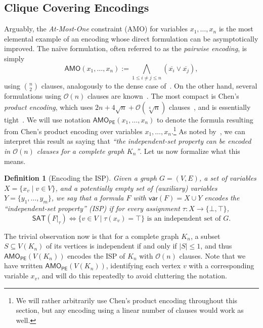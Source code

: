 \documentclass[11pt]{article}
\newtheorem{definition}[theorem]{Definition}
\renewcommand{\O}{\mathcal{O}}
\begin{document}
\subsection{Clique Covering Encodings}
\newcommand{\amope}{\textsf{AMO}_{\textsf{PE}}}
Arguably, the \emph{At-Most-One} constraint (\textsf{AMO}) for variables $x_1, \ldots, x_n$ is the most elemental example of an encoding whose direct formulation can be asymptotically improved. The naïve formulation, often referred to as the \emph{pairwise encoding}, is simply
\[
\textsf{AMO}(x_1, \ldots, x_n) := \bigwedge_{1 \leq i \neq j \leq n} (\overline{x_i} \lor \overline{x_j}),
\]
using $\binom{n}{2}$ clauses, analogously to the dense case of~. On the other hand, several formulations using $\O(n)$ clauses are known~\citep{empirical,zhou2020comparisonsatencodingsatmostk}. The most compact is Chen's \emph{product encoding}, which uses $2n + 4\sqrt{n} + \O(\sqrt[4]{n})$ clauses~\citep{chen2010new}, and is essentially tight~\citep{kuceraLowerBoundCNF2019}. We will use notation $\textsf{AMO}_{\textsf{PE}}(x_1, \ldots, x_n)$ to denote the formula resulting from Chen's product encoding over variables $x_1, \ldots, x_n$.\footnote{We will rather arbitrarily use Chen's product encoding throughout this section, but any encoding using a linear number of clauses would work as well.}
As noted by~\citet{ignatievCardinalityEncodingsGraph2017}, we can interpret this result as saying that \emph{``the independent-set property can be encoded in $\O(n)$ clauses for a complete graph $K_n$''}. Let us now formalize what this means. 

\begin{definition}[Encoding the ISP]
     \label{def:isp_encoding}
    Given a graph $G = (V, E)$,  a set of variables $X = \{ x_v \mid v \in V\}$, and a potentially empty set of (auxiliary) variables $Y = \{y_1, \ldots, y_m\}$, we say that a formula $F$ with $\textsf{var}(F) = X \cup Y$ encodes the ``independent-set property'' (ISP) if for every assignment $\tau : X \to \{\bot, \top\}$,
    \[
        \textsf{SAT}(F |_\tau) \iff \{ v \in V \mid \tau(x_v) = \top \} \text{ is an independent set of } G.
    \]
\end{definition}
The trivial observation now is that for a complete graph $K_n$, a subset $S \subseteq V(K_n)$ of its vertices is independent if and only if $|S| \leq 1$, and thus $\textsf{AMO}_{\textsf{PE}}(V(K_n))$ encodes the ISP of $K_n$ with $\O(n)$ clauses. Note that we have written $\textsf{AMO}_{\textsf{PE}}(V(K_n))$, identifying each vertex $v$ with a corresponding variable $x_v$, and will do this repeatedly to avoid cluttering the notation.
\end{document}
